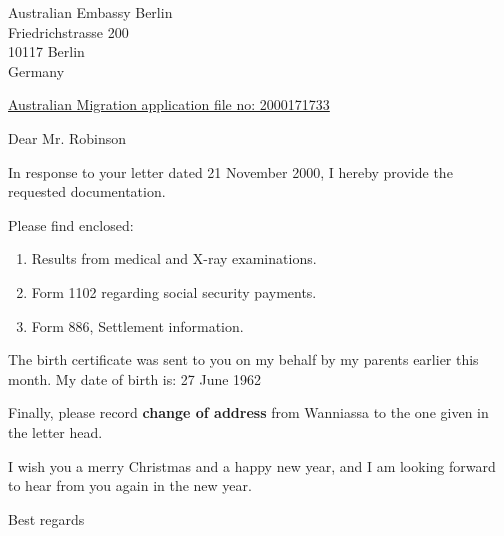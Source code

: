 \documentclass[12pt]{letter}
\begin{document}
\address{Ole M{\o}ller Nielsen     \\
         28 Scrivener Street   \\
         O'Connor, ACT 2602 \\
         Canberra \\
         Australia}


\signature{Ole M{\o}ller Nielsen}

\begin{letter}
{Australian Embassy Berlin \\
 Friedrichstrasse 200 \\
 10117 Berlin \\
 Germany}
 
\opening{\underline{Australian Migration application file no: 2000171733}}

Dear Mr. Robinson

In response to your letter dated 21 November 2000, I
hereby provide the requested documentation.

Please find enclosed:
\begin{enumerate} 
  \item Results from medical and X-ray examinations.
  \item Form 1102 regarding social security payments.
  \item Form 886, Settlement information. 
\end{enumerate}

The birth certificate was sent to you on my behalf by my 
parents earlier this month. My date of birth is: 27 June 1962

Finally, please record {\bf change of address} from Wanniassa to
the one given in the letter head.

I wish you a merry Christmas and a happy new year,
and I am looking forward to hear from you again in the new year.


\closing{Best regards}

\end{letter}
\end{document}
